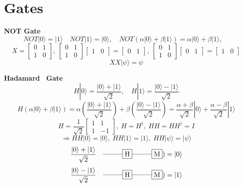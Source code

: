 \documentclass[12pt, fleqn]{article}
\begin{document}
\section{Gates}
\bf{NOT \quad Gate}
\[ NOT|0\rangle = |1\rangle \quad NOT|1\rangle = |0\rangle,\quad NOT (\alpha|0\rangle+\beta|1\rangle)=\alpha|0\rangle+\beta|1\rangle,\quad\]
\[X =\begin{bmatrix}0 & 1\\1 & 0\end{bmatrix},\:
\begin{bmatrix}0 & 1\\1 & 0\end{bmatrix}\begin{bmatrix} 1&0\end{bmatrix}=\begin{bmatrix} 0&1\end{bmatrix},\:
\begin{bmatrix}0 & 1\\1 & 0\end{bmatrix}\begin{bmatrix} 0&1\end{bmatrix}=\begin{bmatrix} 1&0\end{bmatrix}\]
\[XX|\psi\rangle=\psi\]

\bf{Hadamard \, Gate}
\[H|0\rangle = \frac{|0\rangle +|1\rangle}{\sqrt 2}, \quad  H|1\rangle = \frac{|0\rangle -|1\rangle}{\sqrt 2}\]
\[H(\alpha|0\rangle+\beta|1\rangle)=\alpha\left(\frac{|0\rangle+|1\rangle}{\sqrt 2}\right)+\beta\left(\frac{|0\rangle-|1\rangle}{\sqrt 2}\right)
=\frac{\alpha+\beta}{\sqrt 2}|0\rangle+\frac{\alpha-\beta}{\sqrt 2}|1\rangle\]
\[H=\frac{1}{\sqrt 2}\begin{bmatrix}1&1\\1&-1\end{bmatrix},\:H=H^\dagger,\:HH=HH^\dagger=I\]
\[\Rightarrow HH|0\rangle=|0\rangle,\:HH|1\rangle=|1\rangle,\:HH|\psi\rangle=|\psi\rangle\]
\[\frac{|0\rangle +|1\rangle}{\sqrt 2} \quad\rule[3pt]{1cm}{0.3pt}\fbox{H}\rule[3pt]{1cm}{0.3pt}\fbox{M})=|0\rangle\]
\[\frac{|0\rangle -|1\rangle}{\sqrt 2} \quad\rule[3pt]{1cm}{0.3pt}\fbox{H}\rule[3pt]{1cm}{0.3pt}\fbox{M})=|1\rangle\]
\end{document}
